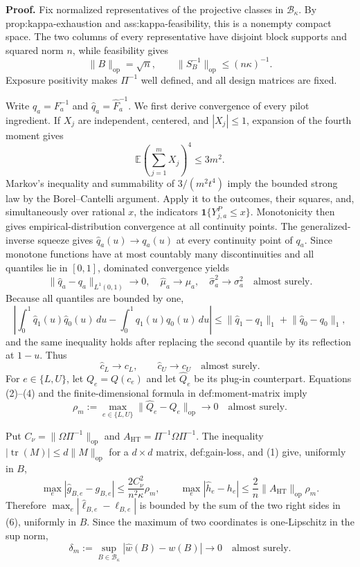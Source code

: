 \textbf{Proof.}
Fix normalized representatives of the projective classes in \(\mathcal B_\kappa\).  By prop:kappa-exhaustion and ass:kappa-feasibility, this is a nonempty compact space.  The two columns of every representative have disjoint block supports and squared norm \(n\), while feasibility gives
\[
\lVert B\rVert_{\mathrm{op}}=\sqrt n,
\qquad
\lVert S_B^{-1}\rVert_{\mathrm{op}}\le(n\kappa)^{-1}.
\tag{1}
\]
Exposure positivity makes \(\Pi^{-1}\) well defined, and all design matrices are fixed.

Write \(q_a=F_a^{-1}\) and \(\widehat q_a=\widehat F_a^{-1}\).  We first derive convergence of every pilot ingredient.  If \(X_j\) are independent, centered, and \(|X_j|\le1\), expansion of the fourth moment gives
\[
\mathbb E\left(\sum_{j=1}^mX_j\right)^4
\le 3m^2.
\]
Markov's inequality and summability of \(3/(m^2t^4)\) imply the bounded strong law by the Borel--Cantelli argument.  Apply it to the outcomes, their squares, and, simultaneously over rational \(x\), the indicators \(\mathbf1\{Y^P_{j,a}\le x\}\).  Monotonicity then gives empirical-distribution convergence at all continuity points.  The generalized-inverse squeeze gives \(\widehat q_a(u)\to q_a(u)\) at every continuity point of \(q_a\).  Since monotone functions have at most countably many discontinuities and all quantiles lie in \([0,1]\), dominated convergence yields
\[
\lVert\widehat q_a-q_a\rVert_{L^1(0,1)}\longrightarrow0,
\quad
\widehat\mu_a\longrightarrow\mu_a,
\quad
\widehat\sigma_a^2\longrightarrow\sigma_a^2
\quad\text{almost surely}.
\tag{2}
\]
Because all quantiles are bounded by one,
\[
\left|\int_0^1\widehat q_1(u)\widehat q_0(u)\,du-
\int_0^1q_1(u)q_0(u)\,du\right|
\le\lVert\widehat q_1-q_1\rVert_1+
\lVert\widehat q_0-q_0\rVert_1,
\tag{3}
\]
and the same inequality holds after replacing the second quantile by its reflection at \(1-u\).  Thus
\[
\widehat c_L\to c_L,
\qquad \widehat c_U\to c_U
\quad\text{almost surely}.
\tag{4}
\]
For \(e\in\{L,U\}\), let \(Q_e=Q(c_e)\) and let \(\widehat Q_e\) be its plug-in counterpart.  Equations (2)--(4) and the finite-dimensional formula in def:moment-matrix imply
\[
\rho_m:=\max_{e\in\{L,U\}}
\lVert\widehat Q_e-Q_e\rVert_{\mathrm{op}}\longrightarrow0
\quad\text{almost surely}.
\tag{5}
\]

Put \(C_\nu=\lVert\Omega\Pi^{-1}\rVert_{\mathrm{op}}\) and \(A_{\mathrm{HT}}=\Pi^{-1}\Omega\Pi^{-1}\).  The inequality \(|\operatorname{tr}(M)|\le d\lVert M\rVert_{\mathrm{op}}\) for a \(d\times d\) matrix, def:gain-loss, and (1) give, uniformly in \(B\),
\[
\max_e|\widehat g_{B,e}-g_{B,e}|
\le \frac{2C_\nu^2}{n^2\kappa}\rho_m,
\qquad
\max_e|\widehat h_e-h_e|
\le \frac{2}{n}\lVert A_{\mathrm{HT}}\rVert_{\mathrm{op}}\rho_m.
\tag{6}
\]
Therefore \(\max_e|\widehat\ell_{B,e}-\ell_{B,e}|\) is bounded by the sum of the two right sides in (6), uniformly in \(B\).  Since the maximum of two coordinates is one-Lipschitz in the sup norm,
\[
\delta_m:=\sup_{B\in\mathcal B_\kappa}
|\widehat w(B)-w(B)|\longrightarrow0
\quad\text{almost surely}.
\tag{7}
\]

